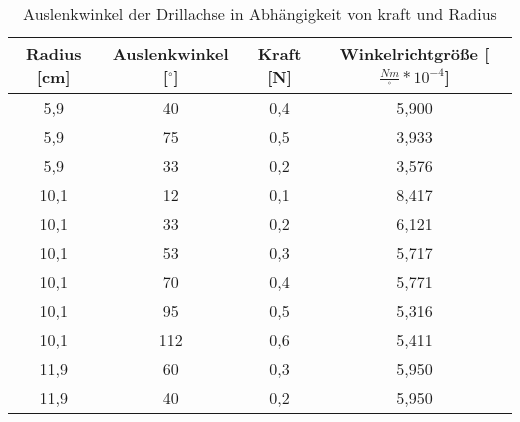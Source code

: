 \begin{table}[h]
	\begin{center}
		\begin{tabular}{cccc}
			Radius [cm]&Auslenkwinkel [$^\circ$]&Kraft [N]&Winkelrichtgröße [$\frac{Nm}{^\circ} *10^{-4}$] \\ \hline
			5,9	&40	&0,4	&5,900\\
			5,9	&75	&0,5	&3,933\\
			5,9	&33	&0,2	&3,576\\
			10,1&12	&0,1	&8,417\\
			10,1&33	&0,2	&6,121\\
			10,1&53	&0,3	&5,717\\
			10,1&70	&0,4	&5,771\\
			10,1&95	&0,5	&5,316\\
			10,1&112&0,6	&5,411\\
			11,9&60	&0,3	&5,950\\
			11,9&40	&0,2	&5,950\\
		\end{tabular}
		\caption{Auslenkwinkel der Drillachse in Abhängigkeit von kraft und Radius}
		\label{tab:drillachse}
	\end{center}
\end{table}